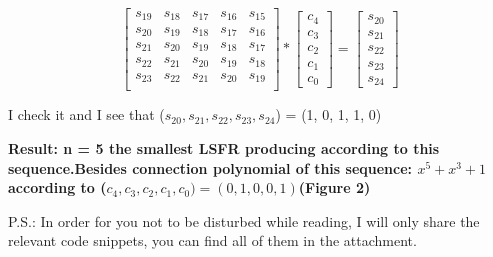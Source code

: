 \documentclass[a4paper, 11pt]{article}
\begin{document}
\begin{center}
  \begin{equation*}
     \begin{bmatrix}
      s_{19} & s_{18} & s_{17} & s_{16} & s_{15}\\
      s_{20} & s_{19} & s_{18} & s_{17} & s_{16}\\
      s_{21} & s_{20} & s_{19} & s_{18} & s_{17}\\
      s_{22} & s_{21} & s_{20} & s_{19} & s_{18}\\
      s_{23} & s_{22} & s_{21} & s_{20} & s_{19}\\
    \end{bmatrix} 
    *
    \begin{bmatrix}
      c_{4}\\  c_{3}\\  c_{2}\\ c_{1}\\  c_{0}
    \end{bmatrix}
    =
    \begin{bmatrix}
      s_{20}\\  s_{21}\\  s_{22}\\ s_{23}\\  s_{24}
    \end{bmatrix}
  \end{equation*}
\end{center}

I check it and I see that ($s_{20} , s_{21}, s_{22}, s_{23}, s_{24}$) = (1, 0, 1, 1, 0)\singlespacing


\noindent\textbf{Result: n = 5 the smallest LSFR producing according to this sequence.Besides connection 
polynomial of this sequence: $x^{5}+x^{3}+1$ according to ($c_{4}, c_{3}, c_{2}, c_{1}, c_{0}) = (0,1,0,0,1)$(Figure 2)}\singlespacing

\singlespacing\noindent P.S.: In order for you not to be disturbed while reading, I will only share the relevant code snippets, you can find all of them in the attachment.
\end{document}
